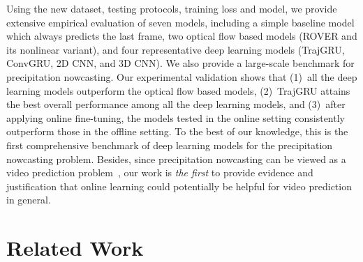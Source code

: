 \documentclass{article}
\begin{document}
Using the new dataset, testing protocols, training loss and model, we provide
extensive empirical evaluation of seven models, including a simple baseline
model which always predicts the last frame, two optical flow based models (ROVER
and its nonlinear variant), and four representative deep learning models
(TrajGRU, ConvGRU, 2D CNN, and 3D CNN). We also provide a large-scale benchmark
for precipitation nowcasting. Our experimental validation shows that (1)~all the
deep learning models outperform the optical flow based models, (2)~TrajGRU
attains the best overall performance among all the deep learning models, and
(3)~after applying online fine-tuning, the models tested in the online setting
consistently outperform those in the offline setting. To the best of our
knowledge, this is the first comprehensive benchmark of deep learning models for
the precipitation nowcasting problem. Besides, since precipitation nowcasting
can be viewed as a video prediction
problem~\cite{ranzato2014video,vondrick2016generating}, our work is \emph{the first} to
provide evidence and justification that online learning could potentially be
helpful for video prediction in general.



\section{Related Work}
\end{document}
